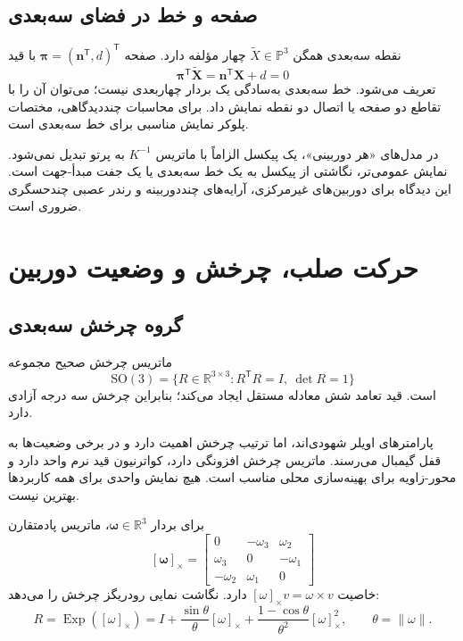 \documentclass[12pt,openany,oneside]{book}
\newcommand{\R}{\mathbb{R}}
\newcommand{\Pj}{\mathbb{P}}
\newcommand{\norm}[1]{\left\lVert #1\right\rVert}
\newcommand{\trans}{^{\mathsf T}}
\newcommand{\vect}[1]{\bm{#1}}
\newcommand{\skewm}[1]{\left[#1\right]_{\times}}
\newcommand{\SO}{\mathrm{SO}}
\newcommand{\Exp}{\operatorname{Exp}}
\begin{document}
\subsection{صفحه و خط در فضای سه‌بعدی}
نقطه سه‌بعدی همگن \(\widetilde X\in\Pj^3\) چهار مؤلفه دارد. صفحه
\(\vect\pi=(\vect n\trans,d)\trans\) با قید
\begin{equation}
\vect\pi\trans\widetilde{\vect X}=\vect n\trans\vect X+d=0
\end{equation}
تعریف می‌شود. خط سه‌بعدی به‌سادگی یک بردار چهاربعدی نیست؛ می‌توان آن را با تقاطع دو صفحه یا اتصال دو نقطه نمایش داد.
برای محاسبات چنددیدگاهی، مختصات پلوکر نمایش مناسبی برای خط سه‌بعدی است.

\begin{futurebox}
در مدل‌های «هر دوربینی»، یک پیکسل الزاماً با ماتریس \(K^{-1}\) به پرتو تبدیل نمی‌شود. نمایش عمومی‌تر، نگاشتی از پیکسل به
یک خط سه‌بعدی یا یک جفت مبدأ-جهت است. این دیدگاه برای دوربین‌های غیرمرکزی، آرایه‌های چنددوربینه و رندر عصبی چندحسگری ضروری است.
\end{futurebox}

\section{حرکت صلب، چرخش و وضعیت دوربین}

\subsection{گروه چرخش سه‌بعدی}
ماتریس چرخش صحیح مجموعه
\begin{equation}
\SO(3)=\{R\in\R^{3\times3}:R\trans R=I,\ \det R=1\}
\end{equation}
است. قید تعامد شش معادله مستقل ایجاد می‌کند؛ بنابراین چرخش سه درجه آزادی دارد.

\begin{warningbox}
پارامترهای اویلر شهودی‌اند، اما ترتیب چرخش اهمیت دارد و در برخی وضعیت‌ها به قفل گیمبال می‌رسند. ماتریس چرخش افزونگی دارد،
کواترنیون قید نرم واحد دارد و محور-زاویه برای بهینه‌سازی محلی مناسب است. هیچ نمایش واحدی برای همه کاربردها بهترین نیست.
\end{warningbox}

برای بردار \(\vect\omega\in\R^3\)، ماتریس پادمتقارن
\begin{equation}
\skewm{\vect\omega}=\begin{bmatrix}
0&-\omega_3&\omega_2\\
\omega_3&0&-\omega_1\\
-\omega_2&\omega_1&0
\end{bmatrix}
\end{equation}
خاصیت \(\skewm{\omega}v=\omega\times v\) دارد. نگاشت نمایی رودریگز چرخش را می‌دهد:
\begin{equation}
R=\Exp(\skewm{\omega})
=I+\frac{\sin\theta}{\theta}\skewm{\omega}
+\frac{1-\cos\theta}{\theta^2}\skewm{\omega}^2,
\qquad \theta=\norm{\omega}.
\label{eq:rodrigues}
\end{equation}
\end{document}
